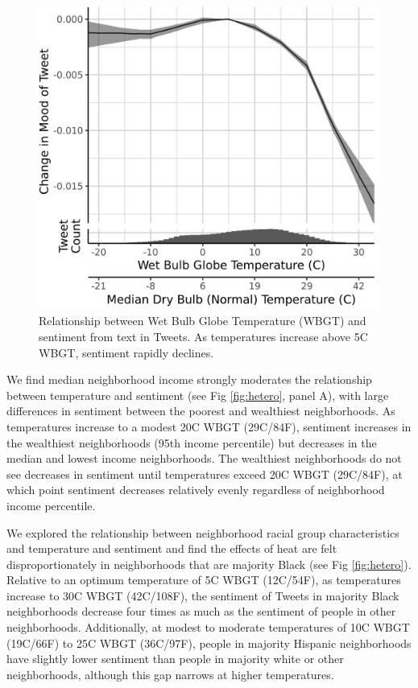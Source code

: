 \documentclass[fleqn,10pt]{wlscirep}
\begin{document}
\begin{figure}[H]
  \centering
  \includegraphics[width=0.5\linewidth]{../res/wbgt.png}
  \caption{Relationship between Wet Bulb Globe Temperature (WBGT) and sentiment from text in Tweets.  As temperatures increase above 5\textdegree C WBGT, sentiment rapidly declines.}
  \label{fig:wbgt}
\end{figure}

We find median neighborhood income strongly moderates the relationship between temperature and sentiment (see Fig \ref{fig:hetero}, panel A), with large differences in sentiment between the poorest and wealthiest neighborhoods. As temperatures increase to a modest 20\textdegree C WBGT (29\textdegree C/84\textdegree F), sentiment increases in the wealthiest neighborhoods (95th income percentile) but decreases in the median and lowest income neighborhoods. The wealthiest neighborhoods do not see decreases in sentiment until temperatures exceed 20\textdegree C WBGT (29\textdegree C/84\textdegree F), at which point sentiment decreases relatively evenly regardless of neighborhood income percentile.

We explored the relationship between neighborhood racial group characteristics and temperature and sentiment and find the effects of heat are felt disproportionately in neighborhoods that are majority Black (see Fig \ref{fig:hetero}). Relative to an optimum temperature of 5\textdegree C WBGT (12\textdegree C/54\textdegree F), as temperatures increase to 30\textdegree C WBGT (42\textdegree C/108\textdegree F), the sentiment of Tweets in majority Black neighborhoods decrease four times as much as the sentiment of people in other neighborhoods. Additionally, at modest to moderate temperatures of 10\textdegree C WBGT (19\textdegree C/66\textdegree F) to 25\textdegree C WBGT (36\textdegree C/97\textdegree F), people in majority Hispanic neighborhoods have slightly lower sentiment than people in majority white or other neighborhoods, although this gap narrows at higher temperatures.
\end{document}
